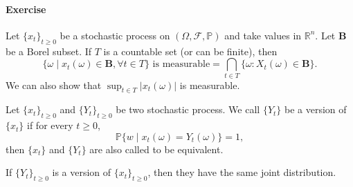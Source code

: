 \paragraph{Exercise}
Let $\{x_t\}_{t\ge0}$ be a stochastic process on $(\Omega,\mathcal{F},\mathbb{P})$ and take values in $\mathbb{R}^n$. Let $\bm B$ be a Borel subset. If $T$ is a countable set (or can be finite), then
\[
\{\omega\mid x_t(\omega)\in\bm B,\forall t\in T\}\text{ is measurable} = \bigcap_{t\in T}\{\omega:X_t(\omega)\in\bm B\}.
\]
We can also show that $\sup_{t\in T}|x_t(\omega)|$ is measurable.

\begin{definition}
Let $\{x_t\}_{t\ge0}$ and $\{Y_t\}_{t\ge0}$ be two stochastic process. We call $\{Y_t\}$ be a version of $\{x_t\}$ if for every $t\ge0$,
\[
\mathbb{P}\{w\mid x_t(\omega)=Y_t(\omega)\}=1,
\]
then $\{x_t\}$ and $\{Y_t\}$ are also called to be equivalent.
\end{definition}
\begin{remark}
If $\{Y_t\}_{t\ge0}$ is a version of $\{x_t\}_{t\ge0}$, then they have the same joint distribution.
\end{remark}










